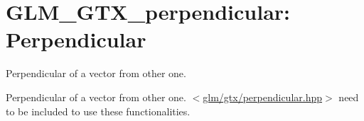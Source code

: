 \hypertarget{group__gtx__perpendicular}{\section{\-G\-L\-M\-\_\-\-G\-T\-X\-\_\-perpendicular\-: \-Perpendicular}
\label{group__gtx__perpendicular}
}


\-Perpendicular of a vector from other one.  


\-Perpendicular of a vector from other one. $<$\hyperlink{perpendicular_8hpp}{glm/gtx/perpendicular.\-hpp}$>$ need to be included to use these functionalities. 
